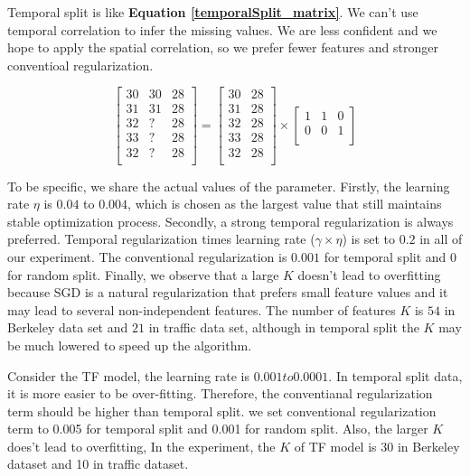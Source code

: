 Temporal split is like \textbf{Equation \ref{temporalSplit_matrix}}.
We can't use temporal correlation to infer the missing values.
We are less confident and we hope to apply the spatial correlation, so we prefer fewer features and stronger conventioal regularization.

\begin{equation}
\label{temporalSplit_matrix}
\begin{bmatrix}
30 & 30 & 28\\
31 & 31 & 28\\
32 &  ? & 28\\
33 &  ? & 28\\
32 &  ? & 28\\
\end{bmatrix} 
= 
\begin{bmatrix}
30 & 28\\
31 & 28\\
32 & 28\\
33 & 28\\
32 & 28\\
\end{bmatrix} 
\times
\begin{bmatrix}
1 & 1 & 0\\
0 & 0 & 1\\
\end{bmatrix} 
\end{equation}

To be specific, we share the actual values of the parameter.
Firstly, the learning rate $\eta$ is $0.04$ to $0.004$, which is chosen as the largest value that still maintains stable optimization process.
Secondly, a strong temporal regularization is always preferred.
Temporal regularization times learning rate ($\gamma \times \eta$) is set to $0.2$ in all of our experiment.
The conventional regularization is $0.001$ for temporal split and $0$ for random split.
Finally, we observe that a large $K$ doesn't lead to overfitting because SGD is a natural regularization that prefers small feature values and it may lead to several non-independent features.
The number of features $K$ is $54$ in Berkeley data set and $21$ in traffic data set, although in temporal split the $K$ may be much lowered to speed up the algorithm. 

Consider the TF model, the learning rate is $0.001 to 0.0001 $. In temporal split data, it is more easier to be over-fitting. Therefore, the conventianal regularization term should be higher than temporal split. we set conventional regularization term to 0.005 for temporal split and 0.001 for random split. Also, the larger $K$ does't lead to overfitting, In the experiment, the $K$ of TF model  is 30 in Berkeley dataset and 10 in traffic dataset.

